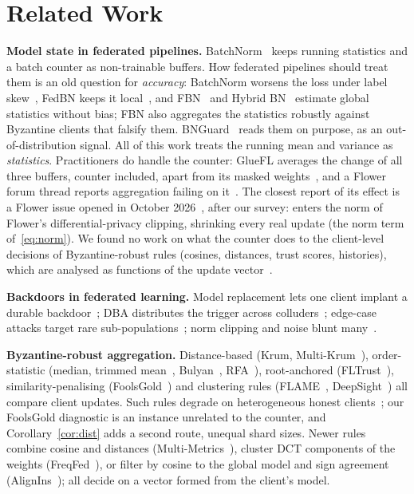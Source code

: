 \documentclass[journal]{IEEEtran}
\begin{document}
\section{Related Work}

\textbf{Model state in federated pipelines.} BatchNorm~\cite{ioffe2015batchnorm}
keeps running statistics and a batch counter as non-trainable buffers. How
federated pipelines should treat them is an old question for \emph{accuracy}:
BatchNorm worsens the loss under label skew~\cite{hsieh2020quagmire}, FedBN keeps it
local~\cite{li2021fedbn}, and FBN~\cite{guerraoui2024fbn} and Hybrid
BN~\cite{chen2025hybridbn} estimate global statistics without bias; FBN also
aggregates the statistics robustly against Byzantine clients that falsify them.
BNGuard~\cite{xu2025oba} reads them on purpose, as an out-of-distribution signal.
All of this work treats the running mean and variance as \emph{statistics}.
Practitioners do handle the counter: GlueFL averages the change of all three
buffers, counter included, apart from its masked weights~\cite{he2022gluefl}, and a
Flower forum thread reports aggregation failing on it~\cite{flowerforum533}. The
closest report of its effect is a Flower issue opened in October
2026~\cite{flower2026issue8298}, after our survey: \nbt{} enters the norm of
Flower's differential-privacy clipping, shrinking every real update (the norm term of~\eqref{eq:norm}). We
found no work on what the counter does to the client-level decisions of
Byzantine-robust rules (cosines, distances, trust scores, histories), which are
analysed as functions of the update
vector~\cite{blanchard2017,yin2018,cao2021fltrust,nguyen2022flame}.

\textbf{Backdoors in federated learning.} Model replacement lets one client implant a
durable backdoor~\cite{bagdasaryan2020}; DBA distributes the trigger across colluders~\cite{xie2020};
edge-case attacks target rare sub-populations~\cite{wang2020tails}; norm clipping and noise
blunt many~\cite{sun2019}.

\textbf{Byzantine-robust aggregation.} Distance-based (Krum, Multi-Krum~\cite{blanchard2017}), order-statistic (median,
trimmed mean~\cite{yin2018}, Bulyan~\cite{mhamdi2018bulyan}, RFA~\cite{pillutla2022rfa}),
root-anchored (FLTrust~\cite{cao2021fltrust}), similarity-penalising
(FoolsGold~\cite{fung2020foolsgold}) and clustering rules (FLAME~\cite{nguyen2022flame},
DeepSight~\cite{rieger2022deepsight}) all compare client updates.
Such rules degrade on heterogeneous honest clients~\cite{karimireddy2022bucketing};
our FoolsGold diagnostic is an instance unrelated to the counter, and
Corollary~\ref{cor:dist} adds a second route, unequal shard sizes. Newer rules
combine cosine and distances (Multi-Metrics~\cite{huang2023multimetrics}), cluster
DCT components of the weights (FreqFed~\cite{fereidooni2024freqfed}), or filter by
cosine to the global model and sign agreement (AlignIns~\cite{xu2025alignins});
all decide on a vector formed from the client's model.
\end{document}
